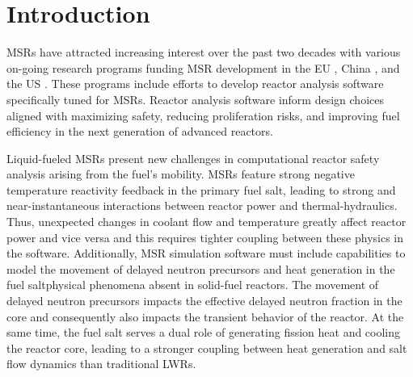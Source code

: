 \section{Introduction} \label{sec:intro}

\glspl{MSR} have attracted increasing interest over the past two
decades with various on-going research programs funding \gls{MSR} development
in the EU \cite{cordis_severe_nodate}, China \cite{dai_17_2017}, and the US
\cite{doe_office_2021}. These programs include efforts to develop
reactor analysis software specifically tuned for \glspl{MSR}. Reactor
analysis software inform design choices aligned with
maximizing safety, reducing proliferation risks, and improving fuel
efficiency in the next generation of advanced reactors.

Liquid-fueled \glspl{MSR} present new challenges in computational reactor
safety analysis arising from the fuel's mobility. \glspl{MSR} feature strong
negative temperature reactivity feedback in the primary fuel salt, leading to
strong and near-instantaneous
interactions between reactor power and thermal-hydraulics. Thus,
unexpected changes in coolant flow and temperature greatly affect reactor
power and vice versa and this requires tighter coupling between these physics
in the software. Additionally, \gls{MSR} simulation software must include
capabilities to model the movement of delayed neutron precursors
and heat generation in the fuel salt\textemdash physical phenomena
absent in solid-fuel reactors. The movement of delayed neutron precursors
impacts the effective delayed neutron fraction in the core and consequently
also impacts the transient behavior of the reactor. At the same time, the fuel
salt serves a dual role of generating fission heat and cooling the reactor
core, leading to a stronger coupling between heat generation and salt flow
dynamics than traditional \glspl{LWR}.

